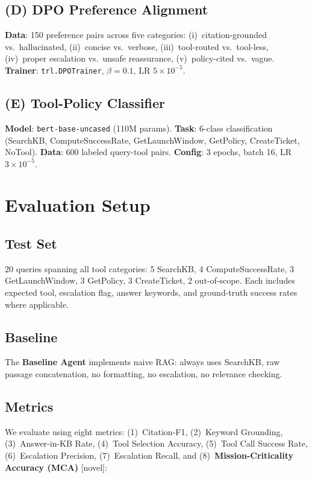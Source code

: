 \documentclass{article}
\begin{document}
\subsection{(D) DPO Preference Alignment}
\textbf{Data}: 150 preference pairs across five categories:
(i)~citation-grounded vs.\ hallucinated,
(ii)~concise vs.\ verbose,
(iii)~tool-routed vs.\ tool-less,
(iv)~proper escalation vs.\ unsafe reassurance,
(v)~policy-cited vs.\ vague.
\textbf{Trainer}: \texttt{trl.DPOTrainer}, $\beta{=}0.1$, LR $5{\times}10^{-5}$.

\subsection{(E) Tool-Policy Classifier}
\textbf{Model}: \texttt{bert-base-uncased} (110M params).
\textbf{Task}: 6-class classification (SearchKB, ComputeSuccessRate, GetLaunchWindow, GetPolicy, CreateTicket, NoTool).
\textbf{Data}: 600 labeled query-tool pairs.
\textbf{Config}: 3 epochs, batch 16, LR $3{\times}10^{-5}$.

\section{Evaluation Setup}

\subsection{Test Set}
20 queries spanning all tool categories: 5 SearchKB, 4 ComputeSuccessRate, 3 GetLaunchWindow, 3 GetPolicy, 3 CreateTicket, 2 out-of-scope. Each includes expected tool, escalation flag, answer keywords, and ground-truth success rates where applicable.

\subsection{Baseline}
The \textbf{Baseline Agent} implements naive RAG: always uses SearchKB, raw passage concatenation, no formatting, no escalation, no relevance checking.

\subsection{Metrics}
We evaluate using eight metrics:
(1)~Citation-F1,
(2)~Keyword Grounding,
(3)~Answer-in-KB Rate,
(4)~Tool Selection Accuracy,
(5)~Tool Call Success Rate,
(6)~Escalation Precision,
(7)~Escalation Recall, and
(8)~\textbf{Mission-Criticality Accuracy (MCA)} [novel]:
\end{document}
